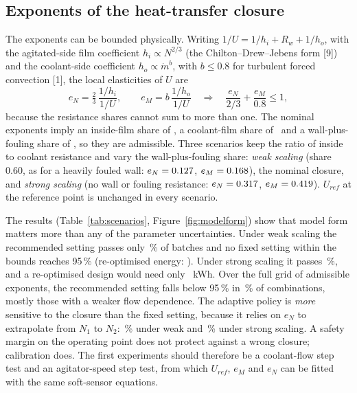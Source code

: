 \documentclass[11pt,letterpaper]{article}
\newcommand{\mdot}{\dot m}
\begin{document}
\subsection{Exponents of the heat-transfer closure}
The exponents can be bounded physically. Writing \(1/U = 1/h_i + R_w + 1/h_o\), with the agitated-side film coefficient \(h_i \propto N^{2/3}\) (the Chilton--Drew--Jebens form [9]) and the coolant-side coefficient \(h_o \propto \mdot^{b}\), with \(b \le 0.8\) for turbulent forced convection [1], the local elasticities of \(U\) are
\begin{equation}
e_N = \tfrac{2}{3}\,\frac{1/h_i}{1/U},\qquad e_M = b\,\frac{1/h_o}{1/U}\quad\Longrightarrow\quad \frac{e_N}{2/3} + \frac{e_M}{0.8} \le 1, \label{eq:admissible}
\end{equation}
because the resistance shares cannot sum to more than one. The nominal exponents imply an inside-film share of \vFIn, a coolant-film share of \vFCo\ and a wall-plus-fouling share of \vFWall, so they are admissible. Three scenarios keep the ratio of inside to coolant resistance and vary the wall-plus-fouling share: \emph{weak scaling} (share 0.60, as for a heavily fouled wall: \(e_N = 0.127\), \(e_M = 0.168\)), the nominal closure, and \emph{strong scaling} (no wall or fouling resistance: \(e_N = 0.317\), \(e_M = 0.419\)). \(U_{ref}\) at the reference point is unchanged in every scenario.

\begin{table}[H]
\centering
\caption{Closure scenarios (STRESS set). ``Fixed'': the recommended \vRecRpm\ rpm setting. ``Adaptive'': the validated policy, planning with the nominal closure. ``Re-opt.\ \(E\)'': minimum expected energy of a 95\,\% fixed design if the scenario were known.}\label{tab:scenarios}
{\small}
\end{table}

The results (Table~\ref{tab:scenarios}, Figure~\ref{fig:modelform}) show that model form matters more than any of the parameter uncertainties. Under weak scaling the recommended setting passes only \vWeakFixed\,\% of batches and no fixed setting within the bounds reaches 95\,\% (re-optimised energy: \vWeakReE). Under strong scaling it passes \vStrongFixed\,\%, and a re-optimised design would need only \vStrongReE\ kWh. Over the full grid of admissible exponents, the recommended setting falls below 95\,\% in \vGridFracAdmFail\,\% of combinations, mostly those with a weaker flow dependence. The adaptive policy is \emph{more} sensitive to the closure than the fixed setting, because it relies on \(e_N\) to extrapolate from \(N_1\) to \(N_2\): \vWeakAd\,\% under weak and \vStrongAd\,\% under strong scaling. A safety margin on the operating point does not protect against a wrong closure; calibration does. The first experiments should therefore be a coolant-flow step test and an agitator-speed step test, from which \(U_{ref}\), \(e_M\) and \(e_N\) can be fitted with the same soft-sensor equations.
\end{document}

